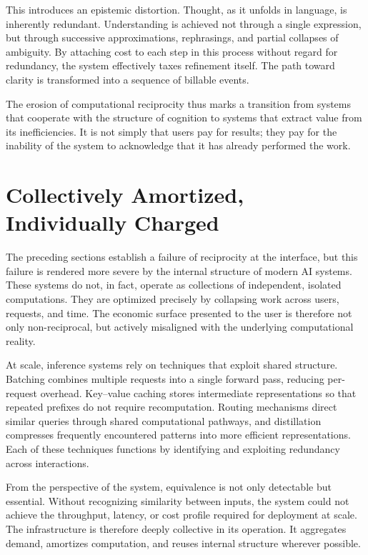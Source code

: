 \documentclass[12pt, oneside]{article}
\begin{document}
This introduces an epistemic distortion. Thought, as it unfolds in language, is inherently redundant. Understanding is achieved not through a single expression, but through successive approximations, rephrasings, and partial collapses of ambiguity. By attaching cost to each step in this process without regard for redundancy, the system effectively taxes refinement itself. The path toward clarity is transformed into a sequence of billable events.

The erosion of computational reciprocity thus marks a transition from systems that cooperate with the structure of cognition to systems that extract value from its inefficiencies. It is not simply that users pay for results; they pay for the inability of the system to acknowledge that it has already performed the work.

\section{Collectively Amortized, Individually Charged}

The preceding sections establish a failure of reciprocity at the interface, but this failure is rendered more severe by the internal structure of modern AI systems. These systems do not, in fact, operate as collections of independent, isolated computations. They are optimized precisely by collapsing work across users, requests, and time. The economic surface presented to the user is therefore not only non-reciprocal, but actively misaligned with the underlying computational reality.

At scale, inference systems rely on techniques that exploit shared structure. Batching combines multiple requests into a single forward pass, reducing per-request overhead. Key–value caching stores intermediate representations so that repeated prefixes do not require recomputation. Routing mechanisms direct similar queries through shared computational pathways, and distillation compresses frequently encountered patterns into more efficient representations. Each of these techniques functions by identifying and exploiting redundancy across interactions.

From the perspective of the system, equivalence is not only detectable but essential. Without recognizing similarity between inputs, the system could not achieve the throughput, latency, or cost profile required for deployment at scale. The infrastructure is therefore deeply collective in its operation. It aggregates demand, amortizes computation, and reuses internal structure wherever possible.
\end{document}
